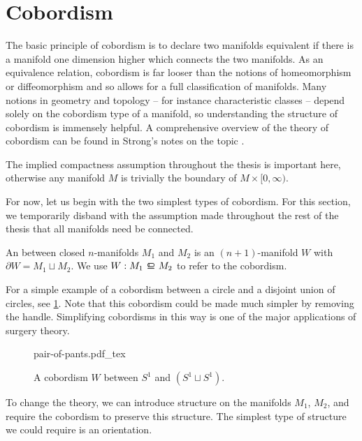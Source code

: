 \pagebreak
\section{Cobordism}\label{sec:cobordism}

The basic principle of cobordism is to declare two manifolds equivalent if there is a manifold one dimension higher which connects the two manifolds. As an equivalence relation, cobordism is far looser than the notions of homeomorphism or diffeomorphism and so allows for a full classification of manifolds. Many notions in geometry and topology -- for instance characteristic classes -- depend solely on the cobordism type of a manifold, so understanding the structure of cobordism is immensely helpful. 
A comprehensive overview of the theory of cobordism can be found in Strong's notes on the topic \cite{strong1968cobordism}.

\begin{remark*}
	The implied compactness assumption throughout the thesis is important here, otherwise any manifold $M$ is trivially the boundary of $M\times [0,\infty)$. 
\end{remark*}

For now, let us begin with the two simplest types of cobordism. For this section, we temporarily disband with the assumption made throughout the rest of the thesis that all manifolds need be connected.

\begin{definition}
	An  between closed $n$-manifolds $M_1$ and $M_2$ is an $(n+1)$-manifold $W$ with $\partial W = M_1\sqcup M_2$. We use $W : M_1\bord M_2$ to refer to the cobordism.
\end{definition}

For a simple example of a cobordism between a circle and a disjoint union of circles, see \cref{fig:pair-of-pants}. Note that this cobordism could be made much simpler by removing the handle. Simplifying cobordisms in this way is one of the major applications of surgery theory.
\begin{figure}[ht]
	\centering
	{pair-of-pants.pdf_tex}
	\caption{A cobordism $W$ between $S^1$ and $(S^1\sqcup S^1)$.}\label{fig:pair-of-pants}
\end{figure}

To change the theory, we can introduce structure on the manifolds $M_1$, $M_2$, and require the cobordism to preserve this structure. The simplest type of structure we could require is an orientation.

